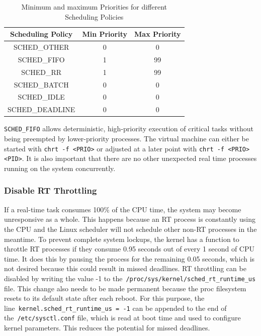 \documentclass[MMR,Master,english]{twbook}
\begin{document}
\begin{table}[H]
	\centering
	\caption{Minimum and maximum Priorities for different Scheduling Policies}
	\label{tab:scheduling_priorities}
	\setlength{\tabcolsep}{0.5em} %
	{\renewcommand{\arraystretch}{1.2}%
		\begin{tabular}{|c|c|c|}
			\hline
			\textbf{Scheduling Policy} & \textbf{Min Priority} & \textbf{Max Priority} \\ \hline
			SCHED\_OTHER               & 0                     & 0                     \\ \hline
			SCHED\_FIFO                & 1                     & 99                    \\ \hline
			SCHED\_RR                  & 1                     & 99                    \\ \hline
			SCHED\_BATCH               & 0                     & 0                     \\ \hline
			SCHED\_IDLE                & 0                     & 0                     \\ \hline
			SCHED\_DEADLINE            & 0                     & 0                     \\ \hline
		\end{tabular}}
\end{table}

\noindent \texttt{SCHED\_FIFO} allows deterministic, high-priority execution of critical tasks without being preempted by lower-priority processes. The virtual machine can either be started with \texttt{chrt -f <PRIO>} or adjusted at a later point with \texttt{chrt -f <PRIO> <PID>}. It is also important that there are no other unexpected real time processes running on the system concurrently.
\subsubsection{Disable RT Throttling}
If a real-time task consumes 100\% of the CPU time, the system may become unresponsive as a whole. This happens because an RT process is constantly using the CPU and the Linux scheduler will not schedule other non-RT processes in the meantime. To prevent complete system lockups, the kernel has a function to throttle RT processes if they consume 0.95 seconds out of every 1 second of CPU time. It does this by pausing the process for the remaining 0.05 seconds, which is not desired because this could result in missed deadlines. RT throttling can be disabled by  writing the value -1 to the~\texttt{/proc/sys/kernel/sched\_rt\_runtime\_us} file. This change also needs to be made permanent because the proc filesystem resets to its default state after each reboot. For this purpose, the line~\texttt{kernel.sched\_rt\_runtime\_us = -1} can be appended to the end of the~\texttt{/etc/sysctl.conf} file, which is read at boot time and used to configure kernel parameters. This reduces the potential for missed deadlines.
\end{document}
